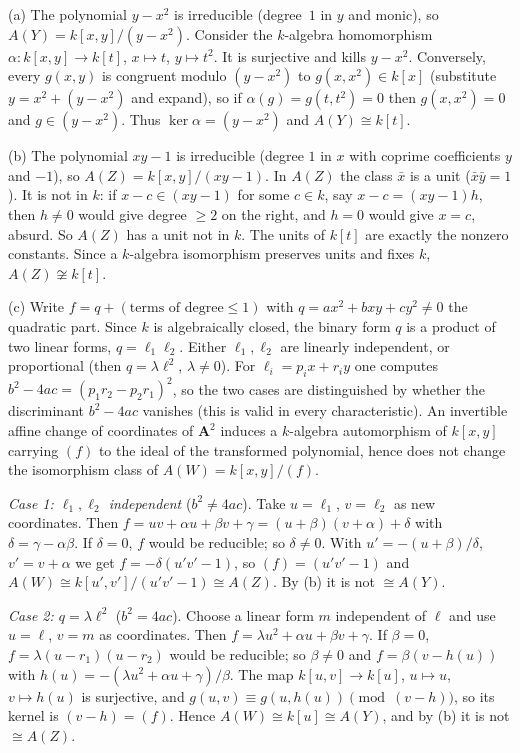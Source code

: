 \documentclass[11pt]{article}
\begin{document}
(a) The polynomial $y-x^2$ is irreducible (degree~$1$ in $y$ and monic), so $A(Y)=k[x,y]/(y-x^2)$. Consider the $k$-algebra homomorphism $\alpha:k[x,y]\to k[t]$, $x\mapsto t$, $y\mapsto t^2$. It is surjective and kills $y-x^2$. Conversely, every $g(x,y)$ is congruent modulo $(y-x^2)$ to $g(x,x^2)\in k[x]$ (substitute $y=x^2+(y-x^2)$ and expand), so if $\alpha(g)=g(t,t^2)=0$ then $g(x,x^2)=0$ and $g\in(y-x^2)$. Thus $\ker\alpha=(y-x^2)$ and $A(Y)\cong k[t]$.

(b) The polynomial $xy-1$ is irreducible (degree $1$ in $x$ with coprime coefficients $y$ and $-1$), so $A(Z)=k[x,y]/(xy-1)$. In $A(Z)$ the class $\bar x$ is a unit ($\bar x\bar y=1$). It is not in $k$: if $x-c\in(xy-1)$ for some $c\in k$, say $x-c=(xy-1)h$, then $h\neq0$ would give degree $\ge 2$ on the right, and $h=0$ would give $x=c$, absurd. So $A(Z)$ has a unit not in $k$. The units of $k[t]$ are exactly the nonzero constants. Since a $k$-algebra isomorphism preserves units and fixes $k$, $A(Z)\not\cong k[t]$.

(c) Write $f=q+(\text{terms of degree}\le1)$ with $q=ax^2+bxy+cy^2\neq0$ the quadratic part. Since $k$ is algebraically closed, the binary form $q$ is a product of two linear forms, $q=\ell_1\ell_2$. Either $\ell_1,\ell_2$ are linearly independent, or proportional (then $q=\lambda\ell^2$, $\lambda\ne0$). For $\ell_i=p_ix+r_iy$ one computes $b^2-4ac=(p_1r_2-p_2r_1)^2$, so the two cases are distinguished by whether the discriminant $b^2-4ac$ vanishes (this is valid in every characteristic). An invertible affine change of coordinates of $\mathbf A^2$ induces a $k$-algebra automorphism of $k[x,y]$ carrying $(f)$ to the ideal of the transformed polynomial, hence does not change the isomorphism class of $A(W)=k[x,y]/(f)$.

\emph{Case 1: $\ell_1,\ell_2$ independent} ($b^2\neq4ac$). Take $u=\ell_1$, $v=\ell_2$ as new coordinates. Then $f=uv+\alpha u+\beta v+\gamma=(u+\beta)(v+\alpha)+\delta$ with $\delta=\gamma-\alpha\beta$. If $\delta=0$, $f$ would be reducible; so $\delta\ne0$. With $u'=-(u+\beta)/\delta$, $v'=v+\alpha$ we get $f=-\delta(u'v'-1)$, so $(f)=(u'v'-1)$ and $A(W)\cong k[u',v']/(u'v'-1)\cong A(Z)$. By (b) it is not $\cong A(Y)$.

\emph{Case 2: $q=\lambda\ell^2$} ($b^2=4ac$). Choose a linear form $m$ independent of $\ell$ and use $u=\ell$, $v=m$ as coordinates. Then $f=\lambda u^2+\alpha u+\beta v+\gamma$. If $\beta=0$, $f=\lambda(u-r_1)(u-r_2)$ would be reducible; so $\beta\ne0$ and $f=\beta(v-h(u))$ with $h(u)=-(\lambda u^2+\alpha u+\gamma)/\beta$. The map $k[u,v]\to k[u]$, $u\mapsto u$, $v\mapsto h(u)$ is surjective, and $g(u,v)\equiv g(u,h(u))\pmod{(v-h)}$, so its kernel is $(v-h)=(f)$. Hence $A(W)\cong k[u]\cong A(Y)$, and by (b) it is not $\cong A(Z)$.
\end{document}
